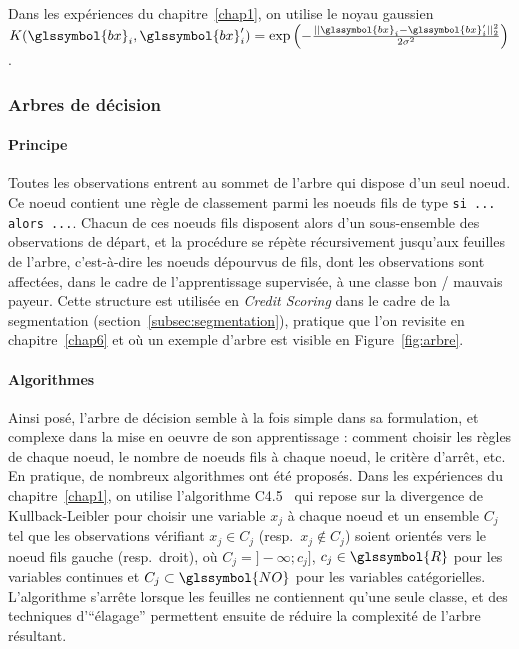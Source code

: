 Dans les expériences du chapitre~\ref{chap1}, on utilise le noyau gaussien $K(\glssymbol{bx}_i,\glssymbol{bx}_i') = \exp \left( - \frac{|| \glssymbol{bx}_i - \glssymbol{bx}_i' ||_2^2}{2 \sigma^2} \right)$.


\subsubsection{Arbres de décision}

\paragraph{Principe}

Toutes les observations entrent au sommet de l'arbre qui dispose d'un seul noeud. Ce noeud contient une règle de classement parmi les noeuds fils de type \verb|si ... alors ...|. Chacun de ces noeuds fils disposent alors d'un sous-ensemble des observations de départ, et la procédure se répète récursivement jusqu'aux feuilles de l'arbre, c'est-à-dire les noeuds dépourvus de fils, dont les observations sont affectées, dans le cadre de l'apprentissage supervisée, à une classe bon / mauvais payeur. Cette structure est utilisée en \textit{Credit Scoring} dans le cadre de la segmentation (section~\ref{subsec:segmentation}), pratique que l'on revisite en chapitre~\ref{chap6} et où un exemple d'arbre est visible en Figure~\ref{fig:arbre}.

\paragraph{Algorithmes}

Ainsi posé, l'arbre de décision semble à la fois simple dans sa formulation, et complexe dans la mise en oeuvre de son apprentissage : comment choisir les règles de chaque noeud, le nombre de noeuds fils à chaque noeud, le critère d'arrêt, etc. En pratique, de nombreux algorithmes ont été proposés. Dans les expériences du chapitre~\ref{chap1}, on utilise l'algorithme C4.5~\cite{quinlan2014c4} qui repose sur la divergence de Kullback-Leibler pour choisir une variable $x_j$ à chaque noeud et un ensemble $C_j$ tel que les observations vérifiant $x_j \in C_j$ (resp.\ $x_j \not\in C_j$) soient orientés vers le noeud fils gauche (resp.\ droit), où $C_j = ]- \infty ; c_j]$, $c_j \in \glssymbol{R}$ pour les variables continues et $C_j \subset \glssymbol{NO}$ pour les variables catégorielles. L'algorithme s'arrête lorsque les feuilles ne contiennent qu'une seule classe, et des techniques d'``élagage'' permettent ensuite de réduire la complexité de l'arbre résultant.

